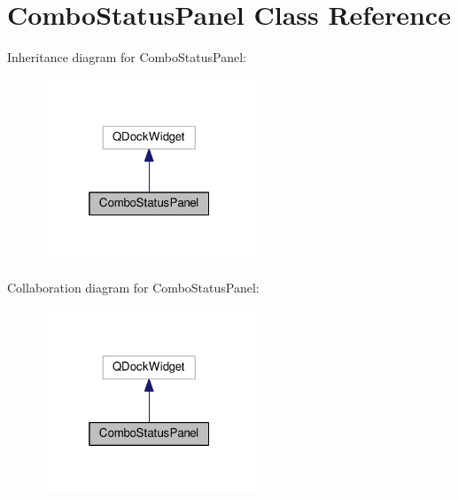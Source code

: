 \hypertarget{class_combo_status_panel}{}\section{Combo\+Status\+Panel Class Reference}
\label{class_combo_status_panel}


Inheritance diagram for Combo\+Status\+Panel\+:\nopagebreak
\begin{figure}[H]
\begin{center}
\leavevmode
\includegraphics[width=181pt]{class_combo_status_panel__inherit__graph}
\end{center}
\end{figure}


Collaboration diagram for Combo\+Status\+Panel\+:\nopagebreak
\begin{figure}[H]
\begin{center}
\leavevmode
\includegraphics[width=181pt]{class_combo_status_panel__coll__graph}
\end{center}
\end{figure}
